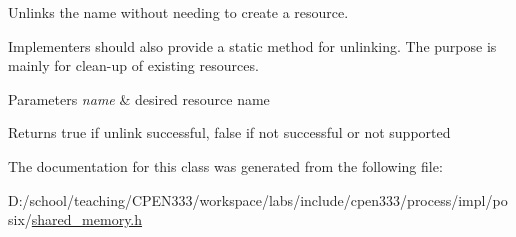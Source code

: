 Unlinks the name without needing to create a resource. 

Implementers should also provide a static method for unlinking. The purpose is mainly for clean-\/up of existing resources.


\begin{DoxyParams}{Parameters}
{\em name} & desired resource name \\
\hline
\end{DoxyParams}
\begin{DoxyReturn}{Returns}
{\ttfamily true} if unlink successful, {\ttfamily false} if not successful or not supported 
\end{DoxyReturn}


The documentation for this class was generated from the following file\+:\begin{DoxyCompactItemize}
\item 
D\+:/school/teaching/\+C\+P\+E\+N333/workspace/labs/include/cpen333/process/impl/posix/\hyperlink{impl_2posix_2shared__memory_8h}{shared\+\_\+memory.\+h}\end{DoxyCompactItemize}
